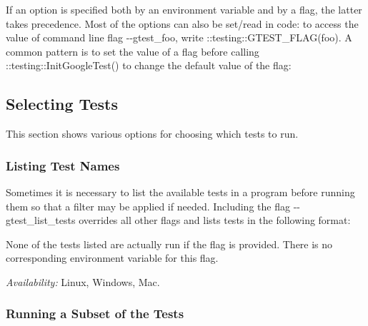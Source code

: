 If an option is specified both by an environment variable and by a flag, the latter takes precedence. Most of the options can also be set/read in code\+: to access the value of command line flag {\ttfamily -\/-\/gtest\+\_\+foo}, write {\ttfamily \+::testing\+::\+G\+T\+E\+S\+T\+\_\+\+F\+L\+A\+G(foo)}. A common pattern is to set the value of a flag before calling {\ttfamily \+::testing\+::\+Init\+Google\+Test()} to change the default value of the flag\+: 
\begin{DoxyCode}{0}
\DoxyCodeLine{}
\DoxyCodeLine{}
\DoxyCodeLine{\}}
\end{DoxyCode}


\subsection*{Selecting Tests}

This section shows various options for choosing which tests to run.

\subsubsection*{Listing Test Names}

Sometimes it is necessary to list the available tests in a program before running them so that a filter may be applied if needed. Including the flag {\ttfamily -\/-\/gtest\+\_\+list\+\_\+tests} overrides all other flags and lists tests in the following format\+: 
\begin{DoxyCode}{0}
\end{DoxyCode}


None of the tests listed are actually run if the flag is provided. There is no corresponding environment variable for this flag.

{\itshape Availability\+:} Linux, Windows, Mac.

\subsubsection*{Running a Subset of the Tests}

